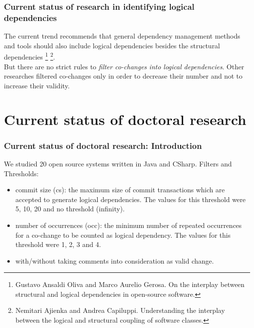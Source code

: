 \documentclass{beamer}
\begin{document}
 \begin{frame}
\frametitle{Current status of research in identifying logical dependencies}
The current trend recommends that general dependency management methods and tools should also include logical dependencies besides the structural dependencies \footnote{Gustavo Ansaldi Oliva and Marco Aurelio Gerosa. On the interplay between
structural and logical dependencies in open-source software.} \footnote{Nemitari Ajienka and Andrea Capiluppi. Understanding the interplay between the logical and structural coupling of software classes.}. \\
But there are no strict rules to \textit{filter co-changes into logical dependencies}. Other researches filtered co-changes only in order to decrease their number and not to increase their validity.

\end{frame}


\section{Current status of doctoral research}
 \begin{frame}
\frametitle{Current status of doctoral research: Introduction}
We studied 20 open source systems written in Java and CSharp.
Filters and Thresholds:
\begin{itemize}
	\item commit size (cs): the maximum size of commit transactions
which are accepted to generate logical dependencies. The
values for this threshold were 5, 10, 20 and no threshold (infinity).
	\item  number of occurrences (occ): the minimum number of
repeated occurrences for a co-change to be counted as logical
dependency. The values for this threshold were 1, 2, 3 and 4.
	\item with/without taking comments into consideration as valid
change.
\end{itemize}


\end{frame}


\end{document}
